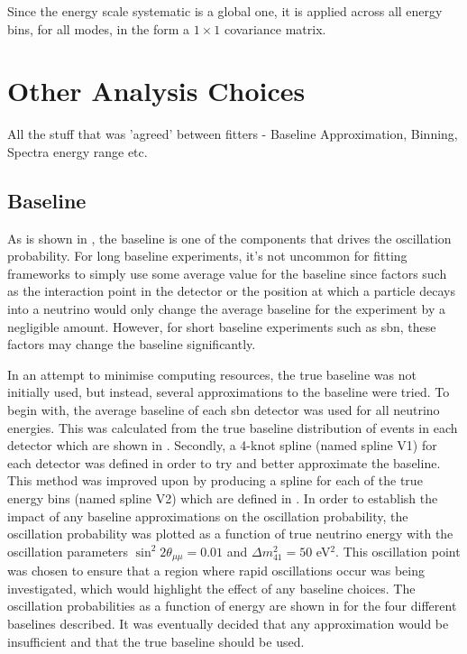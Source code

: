 Since the energy scale systematic is a global one, it is applied across all energy bins, for all modes, in the form a $1 \times 1$ covariance matrix.

\section{Other Analysis Choices}
All the stuff that was 'agreed' between fitters - Baseline Approximation, Binning, Spectra energy range etc.

\subsection{Baseline}
As is shown in , the baseline is one of the components that drives the oscillation probability. For long baseline experiments, it's not uncommon for fitting frameworks to simply use some average value for the baseline since factors such as the interaction point in the detector or the position at which a particle decays into a neutrino would only change the average baseline for the experiment by a negligible amount. However, for short baseline experiments such as \gls{sbn}, these factors may change the baseline significantly. 

In an attempt to minimise computing resources, the true baseline was not initially used, but instead, several approximations to the baseline were tried. To begin with, the average baseline of each \gls{sbn} detector was used for all neutrino energies. This was calculated from the true baseline distribution of \numu events in each detector which are shown in . Secondly, a 4-knot spline (named spline V1) for each detector was defined in order to try and better approximate the baseline. This method was improved upon by producing a spline for each of the true energy bins (named spline V2) which are defined in . In order to establish the impact of any baseline approximations on the oscillation probability, the oscillation probability was plotted as a function of true neutrino energy with the oscillation parameters $\sin^2{2\theta_{\mu\mu}} = 0.01$ and $\Delta m^2_{41} = 50$ eV$^2$. This oscillation point was chosen to ensure that a region where rapid oscillations occur was being investigated, which would highlight the effect of any baseline choices. The oscillation probabilities as a function of energy are shown in  for the four different baselines described. It was eventually decided that any approximation would be insufficient and that the true baseline should be used. 

